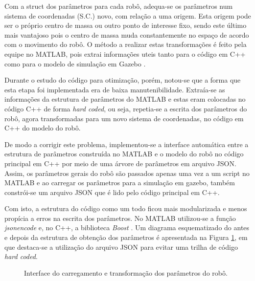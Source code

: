 Com a struct dos parâmetros para cada robô, adequa-se os parâmetros num sistema de coordenadas (S.C.) novo, com relação a uma origem. Esta origem pode ser o próprio centro de massa ou outro ponto de interesse fixo, sendo este último mais vantajoso pois o centro de massa muda constantemente no espaço de acordo com o movimento do robô. O método a realizar estas transformações é feito pela equipe no MATLAB, pois extrai informações uteis tanto para o código em C++ como para o modelo de simulação em Gazebo \cite{1389727}. 

Durante o estudo do código para otimização, porém, notou-se que a forma que esta etapa foi implementada era de baixa manutenibilidade. Extraía-se as informações da estrutura de parâmetros do MATLAB e estas eram colocadas no código C++ de forma \textit{hard coded}, ou seja, repetia-se a escrita dos parâmetros do robô, agora transformadas para um novo sistema de coordenadas, no código em C++ do modelo do robô.

De modo a corrigir este problema, implementou-se a interface automática entre a estrutura de parâmetros construída no MATLAB e o modelo do robô no código principal em C++ por meio de uma árvore de parâmetros em arquivo JSON. Assim, os parâmetros gerais do robô são passados apenas uma vez a um script no MATLAB e ao carregar os parâmetros para a simulação em gazebo, também constrói-se um arquivo JSON que é lido pelo código principal em C++. 

Com isto, a estrutura do código como um todo ficou mais modularizada e menos propícia a erros na escrita dos parâmetros. No MATLAB utilizou-se a função \textit{jsonencode} e, no C++, a biblioteca \textit{Boost} \cite{boost}. Um diagrama esquematizado do antes e depois da estrutura de obtenção dos parâmetros é apresentada na Figura \ref{fig:TEO_1}, em que destaca-se a utilização do arquivo JSON para evitar uma trilha de código \textit{hard coded}.

\begin{figure}
    \centering
    
    
    
    \caption{Interface do carregamento e transformação dos parâmetros do robô.}
    \label{fig:TEO_1}
\end{figure}

